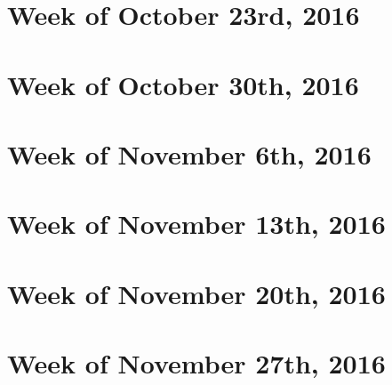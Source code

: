 \documentclass{article}
\begin{document}
\section{Week of October 23rd, 2016}
\section{Week of October 30th, 2016}
\section{Week of November 6th, 2016}
\section{Week of November 13th, 2016}
\section{Week of November 20th, 2016}
\section{Week of November 27th, 2016}
\end{document}
